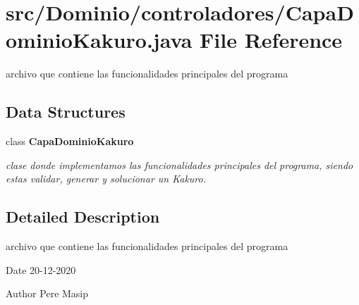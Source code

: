 \section{src/\+Dominio/controladores/\+Capa\+Dominio\+Kakuro.java File Reference}
\label{_capa_dominio_kakuro_8java}


archivo que contiene las funcionalidades principales del programa  


\subsection*{Data Structures}
\begin{DoxyCompactItemize}
\item 
class \textbf{ Capa\+Dominio\+Kakuro}
\begin{DoxyCompactList}\small\item\em clase donde implementamos las funcionalidades principales del programa, siendo estas validar, generar y solucionar un Kakuro. \end{DoxyCompactList}\end{DoxyCompactItemize}


\subsection{Detailed Description}
archivo que contiene las funcionalidades principales del programa 

\begin{DoxyDate}{Date}
20-\/12-\/2020 
\end{DoxyDate}
\begin{DoxyAuthor}{Author}
Pere Masip 
\end{DoxyAuthor}
